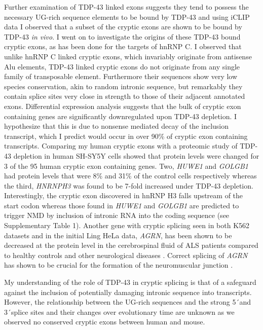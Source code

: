 Further examination of TDP-43 linked exons suggests they tend to possess the necessary UG-rich sequence elements to be bound by TDP-43 and using iCLIP data I observed that a subset of the cryptic exons are shown to be bound by TDP-43 \emph{in vivo}. I went on to investigate the origins of these TDP-43 bound cryptic exons, as has been done for the targets of hnRNP C. I observed that unlike hnRNP C linked cryptic exons, which invariably originate from antisense Alu elements, TDP-43 linked cryptic exons do not originate from any single family of transposable element. Furthermore their sequences show very low species conservation, akin to random intronic sequence, but remarkably they contain splice sites very close in strength to those of their adjacent annotated exons. Differential expression analysis suggests that the bulk of cryptic exon containing genes are significantly downregulated upon TDP-43 depletion. I hypothesize that this is due to nonsense mediated decay of the inclusion transcript, which I predict would occur in over 90\% of cryptic exon containing transcripts. Comparing my human cryptic exons with a proteomic study of TDP-43 depletion in human SH-SY5Y cells \citep{Stalekar2015-qd} showed that protein levels were changed for 3 of the 95 human cryptic exon containing genes. Two, \emph{HUWE1} and \emph{GOLGB1} had protein levels that were 8\% and 31\% of the control cells respectively whereas the third, \emph{HNRNPH3} was found to be 7-fold increased under TDP-43 depletion. Interestingly, the cryptic exon discovered in hnRNP H3 falls upstream of the start codon whereas those found in \emph{HUWE1} and \emph{GOLGB1} are predicted to trigger NMD by inclusion of intronic RNA into the coding sequence (see Supplementary Table 1).  Another gene with cryptic splicing seen in both K562 datasets and in the initial Ling HeLa data, \emph{AGRN}, has been shown to be decreased at the protein level in the cerebrospinal fluid of ALS patients compared to healthy controls and other neurological diseases \citep{Collins2015-xd}. Correct splicing of \emph{AGRN} has shown to be crucial for the formation of the neuromuscular junction \citep{Ruggiu2009-qx}.

My understanding of the role of TDP-43 in cryptic splicing is that of a safeguard against the inclusion of potentially damaging intronic sequence into transcripts. However, the relationship between the UG-rich sequences and the strong 5\'\ and 3\'\ splice sites and their changes over evolutionary time are unknown as we observed no conserved cryptic exons between human and mouse. 

